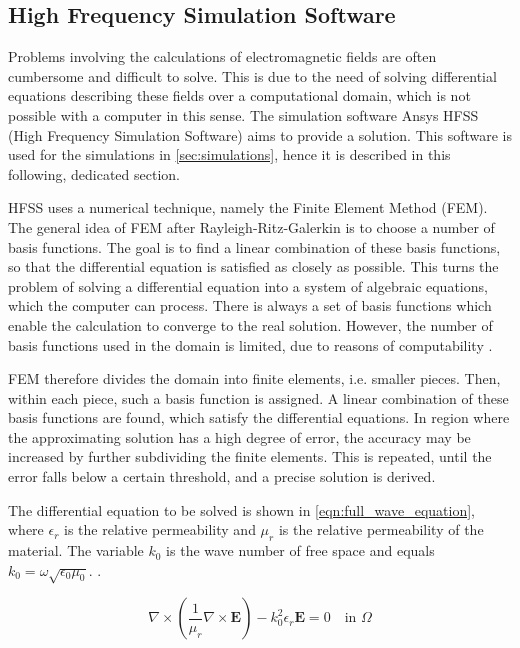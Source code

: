 \subsection{High Frequency Simulation Software}

Problems involving the calculations of electromagnetic fields are often cumbersome and difficult to solve. This is due to the need of solving differential equations describing these fields over a computational domain, which is not possible with a computer in this sense. The simulation software Ansys HFSS (High Frequency Simulation Software) aims to provide a solution. This software is used for the simulations in \autoref{sec:simulations}, hence it is described in this following, dedicated section.

HFSS uses a numerical technique, namely the Finite Element Method (FEM). The general idea of FEM after Rayleigh-Ritz-Galerkin is to choose a number of basis functions. The goal is to find a linear combination of these basis functions, so that the differential equation is satisfied as closely as possible. This turns the problem of solving a differential equation into a system of algebraic equations, which the computer can process. There is always a set of basis functions which enable the calculation to converge to the real solution. However, the number of basis functions used in the domain is limited, due to reasons of computability \cite{STRANG_2018}. 

FEM therefore divides the domain into finite elements, i.e. smaller pieces. Then, within each piece, such a basis function is assigned. A linear combination of these basis functions are found, which satisfy the differential equations. In region where the approximating solution has a high degree of error, the accuracy may be increased by further subdividing the finite elements. This is repeated, until the error falls below a certain threshold, and a precise solution is derived.

The differential equation to be solved is shown in \autoref{eqn:full_wave_equation}, where $\epsilon_r$ is the relative permeability and $\mu_r$ is the relative permeability of the material. The variable $k_0$ is the wave number of free space and equals $k_0=\omega\sqrt{\epsilon_0\mu_0}$. \cite{Cendes_Lee_1988,Lee_Sun_Cendes_1991,Cendes_1991}.

\begin{equation}
    \nabla\times\left(\frac{1}{\mu_r}\nabla\times\mathbf{E}\right)-k_0^2\epsilon_r\mathbf{E}=0 \quad\text{in $\Omega$}
    \label{eqn:full_wave_equation}
\end{equation}

